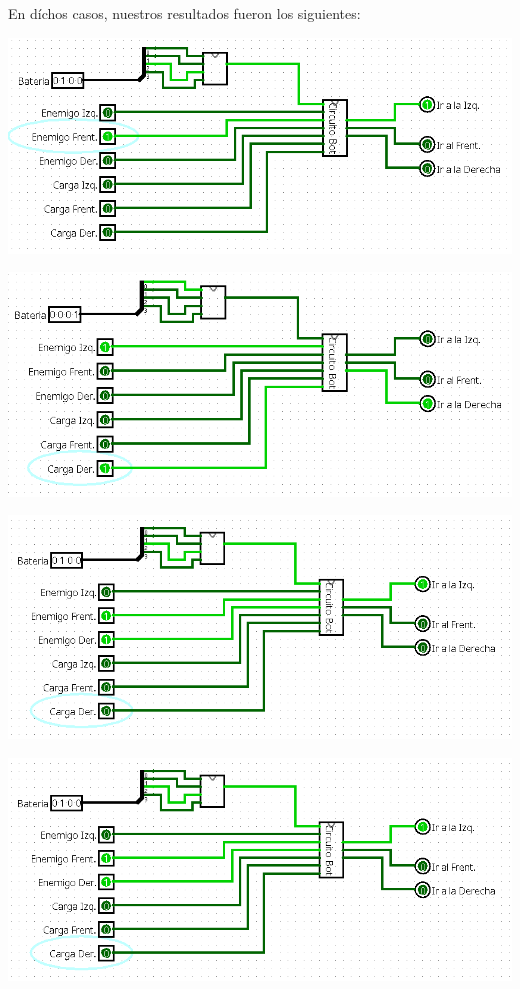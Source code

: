 \documentclass[a4paper]{article}
\begin{document}
En díchos casos, nuestros resultados fueron los siguientes:
\\
\begin{center}
    \includegraphics[width=1\textwidth]{tarea-1-ej-1.png} %
\end{center}
\begin{center}
    \includegraphics[width=1\textwidth]{tarea-1-ej-2.png} %
\end{center}
\begin{center}
    \includegraphics[width=1\textwidth]{tarea-1-ej-3.png} %
\end{center}
\begin{center}
    \includegraphics[width=1\textwidth]{tarea-1-ej-3.png} %
\end{center}
\end{document}
